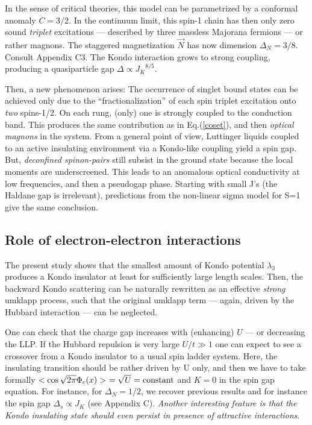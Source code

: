 In the sense of critical theories, this model
can be parametrized by a conformal anomaly $C=3/2$. In the
continuum limit, this spin-1 chain has then only zero sound {\it triplet}
excitations --- described by three massless Majorana fermions ---
or rather magnons. The staggered magnetization 
$\vec{N}$ has now dimension $\Delta_N=3/8$. Consult Appendix C3.
The Kondo interaction grows to strong
coupling, producing a quasiparticle gap $\Delta\propto
{J_K}^{8/5}$. 

Then, a new phenomenon arises: The occurrence 
of singlet bound states can be
achieved only due to the ``fractionalization''
 of each spin triplet excitation onto 
{\it two}
spins-1/2. On each rung, (only)
one is strongly coupled to the conduction band. This
produces the same contribution as in Eq.(\ref{coset}), and then \emph{optical
magnons} in the system. From a general point of view, Luttinger
liquids coupled to an active insulating
environment via a Kondo-like coupling yield
a spin gap\cite{Granath-Johannesson}. 
But, {\it deconfined spinon-pairs} still
subsist in the ground state because
the local moments are underscreened. 
 This leads to an anomalous optical conductivity at low frequencies, and then a pseudogap
phase. Starting with small J's (the Haldane
gap is irrelevant), predictions from the non-linear sigma model for S=1
give the
same conclusion\cite{Tsvelik_charge}.

\subsection{Role of electron-electron interactions}

The present study shows that the smallest amount of Kondo potential
$\lambda_3$ produces a Kondo insulator at least for sufficiently large 
length scales. Then, the backward Kondo scattering can be naturally
rewritten as an effective \emph{strong} 
umklapp process, such that the original umklapp
term --- again, driven by the Hubbard interaction --- can be neglected.

One can check that the charge gap increases with (enhancing) $U$ --- or
decreasing the LLP. If the Hubbard repulsion is very large $U/t\gg 1$ 
one can expect to see a crossover from a Kondo insulator to a usual
spin ladder system\cite{Dagotto-Rice}. Here, the insulating transition should
be rather driven by U only, and then we have to take formally
$<\cos\sqrt{2\pi}\Phi_c(x)>\ =\sqrt{U}=\hbox{constant}$
and $K=0$ in the spin gap equation.
For instance, for $\Delta_N=1/2$, we recover previous results and for
instance the spin gap $\Delta_s\propto J_K$ (see Appendix C).
\vskip 0.05cm
\emph{Another interesting feature is that the
Kondo insulating state should even persist in presence of attractive 
interactions}. 

